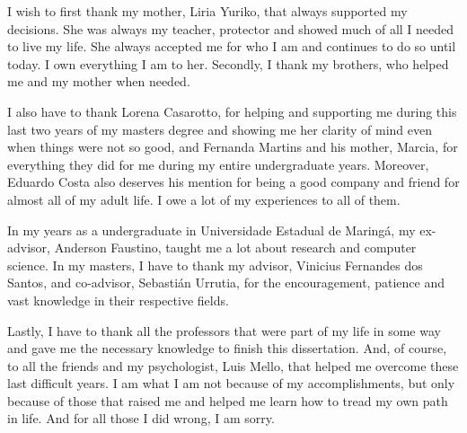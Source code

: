 I wish to first thank my mother, Liria Yuriko, that always supported my decisions. 
She was always my teacher, protector and showed much of all I needed to live my life.
She always accepted me for who I am and continues to do so until today.
I own everything I am to her.
Secondly, I thank my brothers, who helped me and my mother when needed.

I also have to thank Lorena Casarotto, for helping and supporting me during this last 
two years of my masters degree and showing me her clarity of mind even when things were 
not so good, and Fernanda Martins and his mother, Marcia, for everything they did for 
me during my entire undergraduate years.
Moreover, Eduardo Costa also deserves his mention for being a good company and friend 
for almost all of my adult life.
I owe a lot of my experiences to all of them.

In my years as a undergraduate in Universidade Estadual de Maringá, my ex-advisor, 
Anderson Faustino, taught me a lot about research and computer science.
In my masters, I have to thank my advisor, Vinicius Fernandes dos Santos, and co-advisor, 
Sebastián Urrutia, for the encouragement, patience and vast knowledge in their respective 
fields.

Lastly, I have to thank all the professors that were part of my life in some way and 
gave me the necessary knowledge to finish this dissertation. And, of course, to all the 
friends and my psychologist, Luis Mello, that helped me overcome these last difficult years.
I am what I am not because of my accomplishments, but only because of those that raised 
me and helped me learn how to tread my own path in life.
And for all those I did wrong, I am sorry.